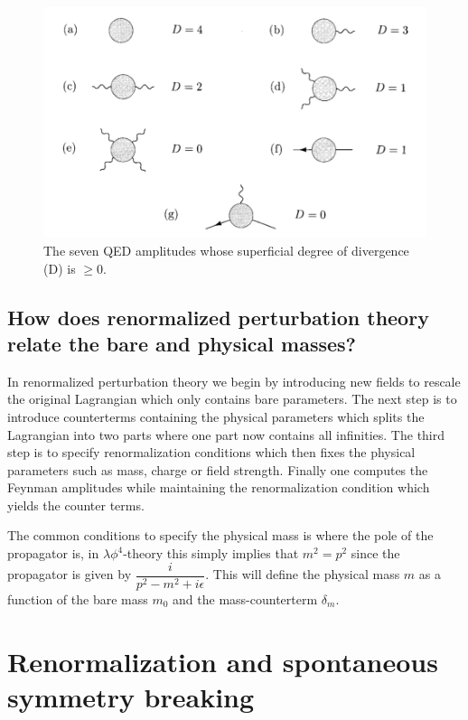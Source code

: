\documentclass[paper=a4, fontsize=11pt]{scrartcl} %
\numberwithin{equation}{section} %
\numberwithin{figure}{section} %
\numberwithin{table}{section} %
\begin{document}
\begin{figure}[hbtp]
\centering
\includegraphics[width=\textwidth]{divergent_diagrams_QED.png}
\caption{The seven QED amplitudes whose superficial degree of divergence (D) is $\geq 0$.}
\label{fig:divergent_diagrams_QED}
\end{figure}


\subsection{How does renormalized perturbation theory relate the bare and physical
masses?}
In renormalized perturbation theory we begin by introducing new fields to rescale the original Lagrangian which only contains bare parameters. The next step is to introduce counterterms containing the physical parameters which splits the Lagrangian into two parts where one part now contains all infinities. The third step is to specify renormalization conditions which then fixes the physical parameters such as mass, charge or field strength. Finally one computes the Feynman amplitudes while maintaining the renormalization condition which yields the counter terms.

The common conditions to specify the physical mass is where the pole of the propagator is, in $\lambda \phi^4$-theory this simply implies that $m^2=p^2$ since the propagator is given by $\dfrac{i}{p^2-m^2+i\epsilon}$. This will define the physical mass $m$ as a function of the bare mass $m_0$ and the mass-counterterm $\delta_m$.

\pagebreak

\section{Renormalization and spontaneous symmetry
breaking}
\end{document}
